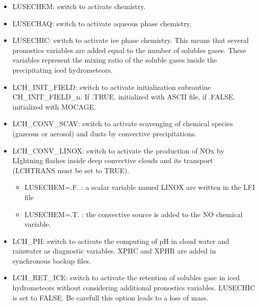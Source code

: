 \begin{itemize}

\item LUSECHEM: switch to activate chemistry.

\item  LUSECHAQ: switch to activate aqueous phase chemistry.

\item  LUSECHIC: switch to activate ice phase chemistry. This means that several pronostics variables are added equal to the number of solubles gases. These variables represent the mixing ratio of the soluble gases inside the precipitating iced hydrometeors.

\item  LCH\_INIT\_FIELD: switch to activate initialization subroutine CH\_INIT\_FIELD\_n. If .TRUE. initialized with ASCII file, if .FALSE. initialized with MOCAGE.

\item  LCH\_CONV\_SCAV: switch to activate scavenging of chemical species (gazeous or aerosol) and dusts by convective precipitations.

\item  LCH\_CONV\_LINOX: switch to activate the production of NOx by LIghtning flashes inside deep convective clouds and its transport (LCHTRANS must be set to TRUE).
\begin{itemize}
          \item  LUSECHEM=.F. : a scalar variable named LINOX are written in the LFI file
          \item  LUSECHEM=.T. : the convective source is added to the NO chemical variable.
\end{itemize}

\item  LCH\_PH: switch to activate the computing of pH in cloud water and rainwater as diagnostic variables. XPHC and XPHR are added in synchronous backup files.

\item  LCH\_RET\_ICE: switch to activate the retention of solubles gase in iced hydrometeors without considering additional pronostics variables. LUSECHIC is set to FALSE. Be carefull this option leads to a loss of mass.


\end{itemize}
